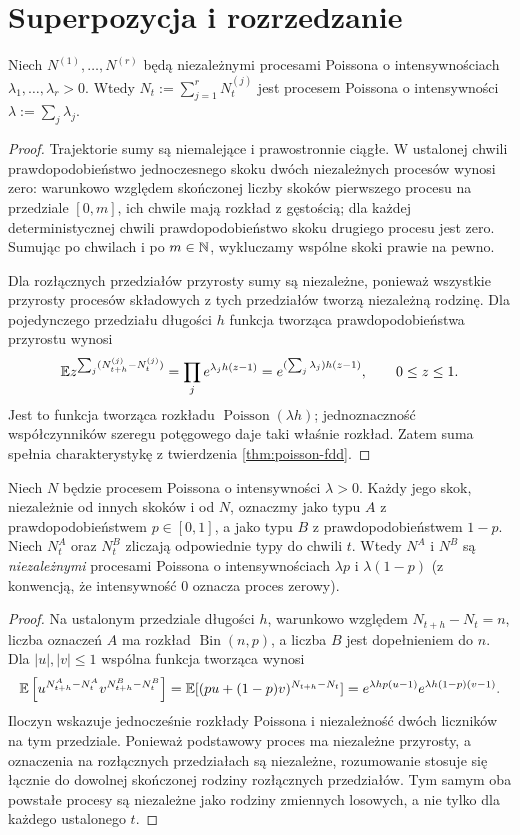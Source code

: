 \section{Superpozycja i rozrzedzanie}
\begin{twierdzenie}[Superpozycja]
Niech $N^{(1)},\ldots,N^{(r)}$ będą niezależnymi procesami
Poissona o intensywnościach $\lambda_1,\ldots,\lambda_r>0$.
Wtedy $N_t:=\sum_{j=1}^rN_t^{(j)}$ jest procesem Poissona
o intensywności $\lambda:=\sum_j\lambda_j$.
\end{twierdzenie}
\begin{proof}
Trajektorie sumy są niemalejące i prawostronnie ciągłe.
W ustalonej chwili prawdopodobieństwo jednoczesnego skoku
dwóch niezależnych procesów wynosi zero: warunkowo względem
skończonej liczby skoków pierwszego procesu na przedziale
$[0,m]$, ich chwile mają rozkład z gęstością;
dla każdej deterministycznej chwili prawdopodobieństwo skoku
drugiego procesu jest zero. Sumując po chwilach i po $m\in\mathbb{N}$,
wykluczamy wspólne skoki prawie na pewno.

Dla rozłącznych przedziałów przyrosty sumy są niezależne,
ponieważ wszystkie przyrosty procesów składowych z tych
przedziałów tworzą niezależną rodzinę. Dla pojedynczego
przedziału długości $h$ funkcja tworząca prawdopodobieństwa
przyrostu wynosi
\[
\mathbb{E} z^{\sum_j (N_{t+h}^{(j)}-N_t^{(j)})}
=\prod_j e^{\lambda_j h(z-1)}
=e^{(\sum_j\lambda_j)h(z-1)},\qquad 0\le z\le1.
\]
Jest to funkcja tworząca rozkładu
$\operatorname{Poisson}(\lambda h)$; jednoznaczność
współczynników szeregu potęgowego daje taki właśnie rozkład.
Zatem suma spełnia charakterystykę z twierdzenia
\ref{thm:poisson-fdd}.
\end{proof}

\begin{twierdzenie}
Niech $N$ będzie procesem Poissona o intensywności $\lambda>0$.
Każdy jego skok, niezależnie od innych skoków i od $N$,
oznaczmy jako typu $A$ z prawdopodobieństwem $p\in[0,1]$,
a jako typu $B$ z prawdopodobieństwem $1-p$.
Niech $N_t^A$ oraz $N_t^B$ zliczają odpowiednie typy do chwili $t$.
Wtedy $N^A$ i $N^B$ są \emph{niezależnymi} procesami Poissona
o intensywnościach $\lambda p$ i $\lambda(1-p)$
(z konwencją, że intensywność $0$ oznacza proces zerowy).
\end{twierdzenie}
\begin{proof}
Na ustalonym przedziale długości $h$, warunkowo względem
$N_{t+h}-N_t=n$, liczba oznaczeń $A$ ma rozkład
$\operatorname{Bin}(n,p)$, a liczba $B$ jest dopełnieniem do $n$.
Dla $|u|,|v|\le1$ wspólna funkcja tworząca wynosi
\[
\mathbb{E}\left[u^{N^A_{t+h}-N^A_t}v^{N^B_{t+h}-N^B_t}\right]
=\mathbb{E}[ (pu+(1-p)v)^{N_{t+h}-N_t}]
=e^{\lambda h p(u-1)}e^{\lambda h(1-p)(v-1)}.
\]
Iloczyn wskazuje jednocześnie rozkłady Poissona i
niezależność dwóch liczników na tym przedziale.
Ponieważ podstawowy proces ma niezależne przyrosty, a
oznaczenia na rozłącznych przedziałach są niezależne,
rozumowanie stosuje się łącznie do dowolnej skończonej
rodziny rozłącznych przedziałów. Tym samym oba powstałe
procesy są niezależne jako rodziny zmiennych losowych,
a nie tylko dla każdego ustalonego $t$.
\end{proof}

